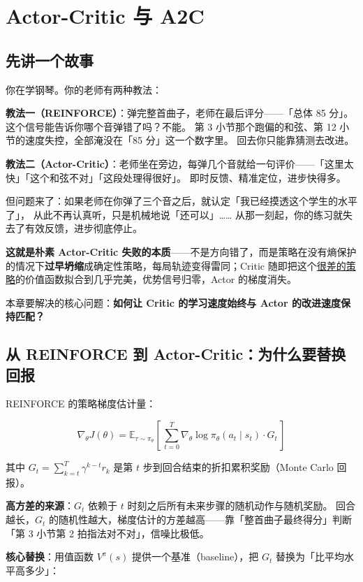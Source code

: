 \documentclass{article}
\begin{document}
\section*{Actor-Critic 与 A2C}

\subsection*{先讲一个故事}

你在学钢琴。你的老师有两种教法：

\textbf{教法一（REINFORCE）}：弹完整首曲子，老师在最后评分——「总体 85 分」。
这个信号能告诉你哪个音弹错了吗？不能。
第 3 小节那个跑偏的和弦、第 12 小节的速度失控，全部淹没在「85 分」这一个数字里。
回去你只能靠猜测去改进。

\textbf{教法二（Actor-Critic）}：老师坐在旁边，每弹几个音就给一句评价——「这里太快」「这个和弦不对」「这段处理得很好」。
即时反馈、精准定位，进步快得多。

但问题来了：如果老师在你弹了三个音之后，就认定「我已经摸透这个学生的水平了」，
从此不再认真听，只是机械地说「还可以」……
从那一刻起，你的练习就失去了有效反馈，进步彻底停止。

\textbf{这就是朴素 Actor-Critic 失败的本质}——不是方向错了，而是策略在没有熵保护的情况下\textbf{过早坍缩}成确定性策略，每局轨迹变得雷同；Critic 随即把这个\underline{很差的策略}的价值函数拟合到几乎完美，优势信号归零，Actor 的梯度消失。

本章要解决的核心问题：\textbf{如何让 Critic 的学习速度始终与 Actor 的改进速度保持匹配？}

\subsection*{从 REINFORCE 到 Actor-Critic：为什么要替换回报}

REINFORCE 的策略梯度估计量：

\[
\nabla_\theta J(\theta) = \mathbb{E}_{\tau \sim \pi_\theta}\!\left[\,\sum_{t=0}^{T}
\nabla_\theta \log \pi_\theta(a_t \mid s_t) \cdot G_t\,\right]
\]

其中 $G_t = \sum_{k=t}^{T} \gamma^{k-t} r_k$ 是第 $t$ 步到回合结束的折扣累积奖励（Monte Carlo 回报）。

\textbf{高方差的来源}：$G_t$ 依赖于 $t$ 时刻之后所有未来步骤的随机动作与随机奖励。
回合越长，$G_t$ 的随机性越大，梯度估计的方差越高——靠「整首曲子最终得分」判断「第 3 小节第 2 拍指法对不对」，信噪比极低。

\textbf{核心替换}：用值函数 $V^\pi(s)$ 提供一个基准（baseline），把 $G_t$ 替换为「比平均水平高多少」：
\end{document}
